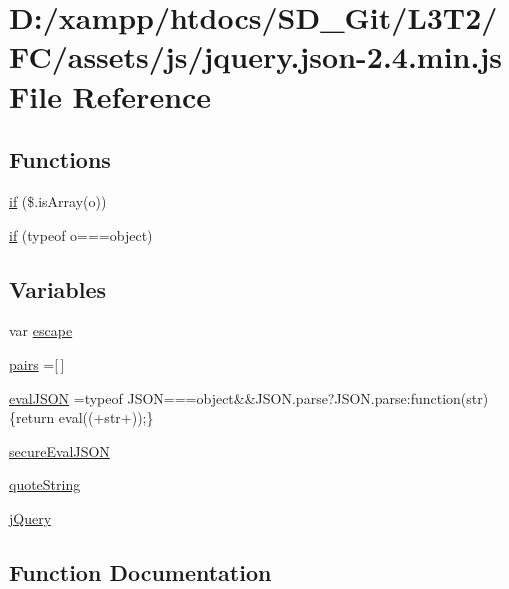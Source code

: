 \hypertarget{jquery_8json-2_84_8min_8js}{}\section{D\+:/xampp/htdocs/\+S\+D\+\_\+\+Git/\+L3\+T2/\+F\+C/assets/js/jquery.json-\/2.4.min.\+js File Reference}
\label{jquery_8json-2_84_8min_8js}
\subsection*{Functions}
\begin{DoxyCompactItemize}
\item 
\hyperlink{jquery_8json-2_84_8min_8js_a0bfb64d001b5544c94b8420c3a8f426a}{if} (\$.is\+Array(o))
\item 
\hyperlink{jquery_8json-2_84_8min_8js_a1a372d6f05f22dc23e96d07c4bd28293}{if} (typeof o===\textquotesingle{}object\textquotesingle{})
\end{DoxyCompactItemize}
\subsection*{Variables}
\begin{DoxyCompactItemize}
\item 
var \hyperlink{jquery_8json-2_84_8min_8js_a07247c5ae15cb483ef7b2039b9197dfb}{escape}
\item 
\hyperlink{jquery_8json-2_84_8min_8js_a8b16b1e1994f9c318702b801bd3b8420}{pairs} =\mbox{[}$\,$\mbox{]}
\item 
\hyperlink{jquery_8json-2_84_8min_8js_a2c2f3aab0e995e6fa08e34055abb4c44}{eval\+J\+S\+O\+N} =typeof J\+S\+O\+N===\textquotesingle{}object\textquotesingle{}\&\&J\+S\+O\+N.\+parse?J\+S\+O\+N.\+parse\+:function(str)\{return eval(\textquotesingle{}(\textquotesingle{}+str+\textquotesingle{})\textquotesingle{});\}
\item 
\hyperlink{jquery_8json-2_84_8min_8js_a2445973cacc5a60c85bc69c811f00341}{secure\+Eval\+J\+S\+O\+N}
\item 
\hyperlink{jquery_8json-2_84_8min_8js_aa584fd247f1b28833fd9a071fc66980a}{quote\+String}
\item 
\hyperlink{jquery_8json-2_84_8min_8js_a2b1d6f9c448e3ce72f4e1865d6e38d2c}{j\+Query}
\end{DoxyCompactItemize}


\subsection{Function Documentation}
\hypertarget{jquery_8json-2_84_8min_8js_a0bfb64d001b5544c94b8420c3a8f426a}{}
